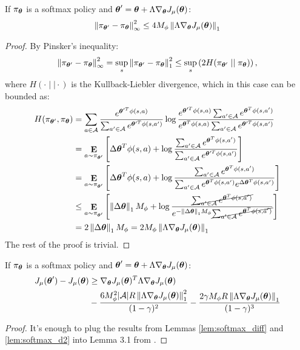 \begin{lemma}\label{lem:softmax_infnorm}
If $\pi_{\vtheta}$ is a softmax policy and $\vtheta' = \vtheta+\Lambda\gradJ{\vtheta}$:
\[
	\norm[\infty]{\pi_{\vtheta'} - \pi_{\vtheta}}^2 \leq 4M_\phi\norm[1]{\Lambda\gradJ{\vtheta}}
\]
\end{lemma}
\begin{proof}
By Pinsker's inequality:
\begin{align*}
\norm[\infty]{\pi_{\vtheta'} - \pi_{\vtheta}}^2 = \sup_s\norm[1]{\pi_{\vtheta'} - \pi_{\vtheta}}^2 \leq \sup_s\left(2H(\pi_{\vtheta'}\mid\mid\pi_{\vtheta})\right),
\end{align*}
where $H(\cdot\mid\mid\cdot)$ is the Kullback-Liebler divergence, which in this case can be bounded as:
\begin{align*}
H(\pi_{\vtheta'},\pi_{\vtheta}) &= 
\sum_{a \in \mathcal{A}}
	\frac{e^{\vtheta'^T\phi(s,a)}}{\sum_{a'\in\mathcal{A}}e^{\vtheta'^T\phi(s,a')}}
	\log\frac{e^{\vtheta'^T\phi(s,a)}\sum_{a'\in\mathcal{A}}e^{\vtheta^T\phi(s,a')}}
	{e^{\vtheta^T\phi(s,a)}\sum_{a'\in\mathcal{A}}e^{\vtheta'^T\phi(s,a')}} \\
	&= \expected{a}{\vtheta'}{
	\Delta\vtheta^T\phi(s,a) + \log\frac{\sum_{a'\in\mathcal{A}}e^{\vtheta^T\phi(s,a')}}
	{\sum_{a'\in\mathcal{A}}e^{\vtheta'^T\phi(s,a')}}} \\
	&= \expected{a}{\vtheta'}{
	\Delta\vtheta^T\phi(s,a) + \log\frac{\sum_{a'\in\mathcal{A}}e^{\vtheta^T\phi(s,a')}}		{\sum_{a'\in\mathcal{A}}e^{\vtheta^T\phi(s,a')}e^{\Delta\vtheta^T\phi(s,a')}}} \\
	&\leq \expected{a}{\vtheta'}{
	\norm[1]{\Delta\vtheta}M_\phi + \log\frac{\cancel{\sum_{a'\in\mathcal{A}}e^{\vtheta^T\phi(s,a')}}}
	{e^{-\norm[1]{\Delta\vtheta}M_\phi}\cancel{\sum_{a'\in\mathcal{A}}e^{\vtheta^T\phi(s,a')}}}} \\
	&= 2\norm[1]{\Delta\vtheta}M_\phi = 2M_\phi\norm[1]{\Lambda\gradJ{\vtheta}} 	
\end{align*}
The rest of the proof is trivial.
\end{proof}

\begin{theorem}
If $\pi_{\vtheta}$ is a softmax policy and $\vtheta' = \vtheta+\Lambda\gradJ{\vtheta}$:
\begin{align*}
\DeltaJ &\geq \gradJ{\vtheta}^T\Lambda\gradJ{\vtheta} \\
	&- \frac{6M_{\phi}^2|\mathcal{A}|R\norm[1]{\Lambda\gradJ{\vtheta}}^2}{(1-\gamma)^2} -
	\frac{2\gamma M_{\phi}R\norm[1]{\Lambda\gradJ{\vtheta}}}{(1-\gamma)^3}
\end{align*}
\end{theorem}
\begin{proof}
It's enough to plug the results from Lemmas \ref{lem:softmax_diff} and \ref{lem:softmax_d2} into Lemma 3.1 from \cite{Pirotta2013adaptive}.
\end{proof}